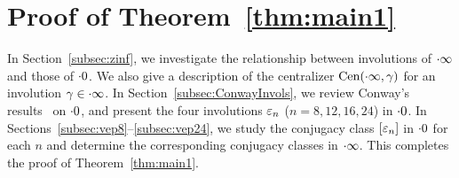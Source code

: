 \documentclass{amsart} %
\begin{document}
\section{Proof of Theorem~\ref{thm:main1}}\label{sec:proofofmain1}
%
In Section~\ref{subsec:zinf}, 
we investigate the relationship between involutions of $\cdot \infty$ and those of $\cdot 0$.
We also give a description of the centralizer $\mathrm{Cen}(\cdot \infty, \gamma)$
for an involution $\gamma\in \cdot \infty$.
In Section~\ref{subsec:ConwayInvols}, 
we review Conway's results~\cite[Chapter 10]{theCSbook} on $\cdot 0$, 
and present the four involutions $\varepsilon_n$ ($n=8,12,16,24$) 
 in $\cdot 0$.
In Sections~\ref{subsec:vep8}--\ref{subsec:vep24}, 
we study the conjugacy class $[\varepsilon_n]$ in $\cdot 0$ for each $n$ 
and determine the corresponding conjugacy classes in $\cdot \infty$. This completes the proof of Theorem~\ref{thm:main1}.
%
%
\end{document}
